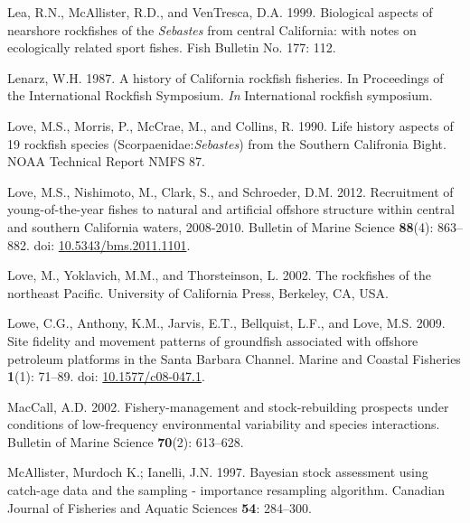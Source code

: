 \documentclass[11pt,
  english,
]{article}
\newlength{\cslhangindent}
\newenvironment{CSLReferences}[2] %
 {%
  \setlength{\parindent}{0pt}
  \ifodd #1 \everypar{\setlength{\hangindent}{\cslhangindent}}\ignorespaces\fi
  \ifnum #2 > 0
  \setlength{\parskip}{#2\baselineskip}
  \fi
 }%
 {}
\begin{document}
\begin{CSLReferences}{1}{0}
\leavevmode{}%
Lea, R.N., McAllister, R.D., and VenTresca, D.A. 1999. {Biological aspects of nearshore rockfishes of the \emph{Sebastes} from central California: with notes on ecologically related sport fishes.} Fish Bulletin No. 177: 112.

\leavevmode{}%
Lenarz, W.H. 1987. {A history of California rockfish fisheries. In Proceedings of the International Rockfish Symposium.} \emph{In} International rockfish symposium.

\leavevmode{}%
Love, M.S., Morris, P., McCrae, M., and Collins, R. 1990. {Life history aspects of 19 rockfish species (Scorpaenidae:\emph{Sebastes}) from the Southern Califronia Bight}. NOAA Technical Report NMFS 87.

\leavevmode{}%
Love, M.S., Nishimoto, M., Clark, S., and Schroeder, D.M. 2012. {Recruitment of young-of-the-year fishes to natural and artificial offshore structure within central and southern California waters, 2008-2010}. Bulletin of Marine Science \textbf{88}(4): 863--882. doi: \href{https://doi.org/10.5343/bms.2011.1101}{10.5343/bms.2011.1101}.

\leavevmode{}%
Love, M., Yoklavich, M.M., and Thorsteinson, L. 2002. {The rockfishes of the northeast Pacific}. University of California Press, Berkeley, CA, USA.

\leavevmode{}%
Lowe, C.G., Anthony, K.M., Jarvis, E.T., Bellquist, L.F., and Love, M.S. 2009. {Site fidelity and movement patterns of groundfish associated with offshore petroleum platforms in the Santa Barbara Channel}. Marine and Coastal Fisheries \textbf{1}(1): 71--89. doi: \href{https://doi.org/10.1577/c08-047.1}{10.1577/c08-047.1}.

\leavevmode{}%
MacCall, A.D. 2002. {Fishery-management and stock-rebuilding prospects under conditions of low-frequency environmental variability and species interactions}. Bulletin of Marine Science \textbf{70}(2): 613--628.

\leavevmode{}%
McAllister, Murdoch K.; Ianelli, J.N. 1997. {Bayesian stock assessment using catch-age data and the sampling - importance resampling algorithm}. Canadian Journal of Fisheries and Aquatic Sciences \textbf{54}: 284--300.


\end{CSLReferences}
\end{document}
